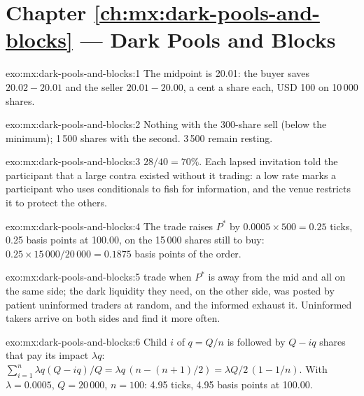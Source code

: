\section*{Chapter \ref{ch:mx:dark-pools-and-blocks} --- Dark Pools and Blocks}

\begin{solution}{exo:mx:dark-pools-and-blocks:1}
The midpoint is 20.01: the buyer saves $20.02-20.01$ and the seller $20.01-20.00$, a cent a share each, USD 100 on 10\,000 shares.
\end{solution}

\begin{solution}{exo:mx:dark-pools-and-blocks:2}
Nothing with the 300-share sell (below the minimum); 1\,500 shares with the second. 3\,500 remain resting.
\end{solution}

\begin{solution}{exo:mx:dark-pools-and-blocks:3}
$28/40=70\%$. Each lapsed invitation told the participant that a large contra existed without it trading: a low rate marks a participant who uses
conditionals to fish for information, and the venue restricts it to protect the others.
\end{solution}

\begin{solution}{exo:mx:dark-pools-and-blocks:4}
The trade raises $P^\ast$ by $0.0005\times500=0.25$ ticks, 0.25 basis points at 100.00, on the 15\,000 shares still to buy: $0.25\times15\,000/20\,000=0.1875$
basis points of the order.
\end{solution}

\begin{solution}{exo:mx:dark-pools-and-blocks:5}
 trade when $P^\ast$ is away from the mid and all on the same side; the dark liquidity they need, on the other side, was posted by
patient uninformed traders at random, and the informed exhaust it. Uninformed takers arrive on both sides and find it more often.
\end{solution}

\begin{solution}{exo:mx:dark-pools-and-blocks:6}
Child $i$ of $q=Q/n$ is followed by $Q-iq$ shares that pay its impact $\lambda q$: $\sum_{i=1}^{n}\lambda q(Q-iq)/Q=\lambda q\,(n-(n+1)/2)=\lambda Q/2\,(1-1/n)$.
With $\lambda=0.0005$, $Q=20\,000$, $n=100$: 4.95 ticks, 4.95 basis points at 100.00.
\end{solution}

